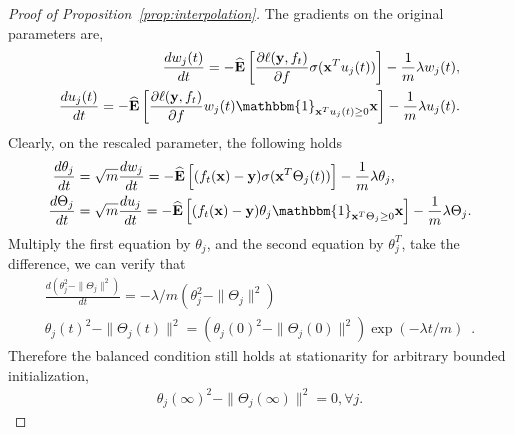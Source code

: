 \documentclass[11pt]{article}
\numberwithin{equation}{section}
\def\bd#1{\mathbf{#1}}
\def\bx{\bd{x}}
\def\by{\bd{y}}
\begin{document}
\begin{proof}[Proof of Proposition~\ref{prop:interpolation}]
    The gradients on the original parameters are,
    \begin{align*}
        \frac{dw_j(t)}{dt} = -\widehat{\mathbf{E}}\left[\frac{\partial \ell(\by,f_t)}{\partial f}\sigma(\bx^Tu_j(t))\right] - \frac{1}{m}\lambda w_j(t),\\
        \frac{du_j(t)}{dt} = -\widehat{\mathbf{E}}\left[\frac{\partial \ell(\by,f_t)}{\partial f}w_j(t)\mathbbm{1}_{\bx^Tu_j(t)\geq0}\bx\right] - \frac{1}{m}\lambda u_j(t).
    \end{align*}
    Clearly, on the rescaled parameter, the following holds
 \begin{align*}
    \frac{d\theta_{j}}{dt} &= \sqrt{m} \frac{d w_{j}}{dt}= -\widehat{\mathbf{E}}\left[(f_t(\bx) - \by) \sigma(\bx^T\Theta_j(t))\right] - \frac{1}{m} \lambda \theta_{j}, \\
    \frac{d\Theta_{j}}{dt} &= \sqrt{m} \frac{d u_{j}}{dt}= -\widehat{\mathbf{E}}\left[(f_t(\bx) - \by) \theta_{j}\mathbbm{1}_{\bx^T\Theta_{j}\geq0}\bx\right] - \frac{1}{m} \lambda \Theta_j.
\end{align*} 
Multiply the first equation by $\theta_j$, and the second equation by $\theta_j^T$, take the difference, we can verify that    
\begin{align}
    \frac{d ( \theta_j^2 - \| \Theta_j \|^2)}{dt}=  - \lambda/m ( \theta_j^2 - \| \Theta_j \|^2) \\
    \theta_j(t)^2 - \| \Theta_j(t) \|^2 = \left( \theta_j(0)^2 - \| \Theta_j(0) \|^2 \right) \exp(-\lambda t/m ) \enspace. \label{eq:balanced}
\end{align}
Therefore the balanced condition still holds at stationarity for arbitrary bounded initialization,
\begin{align*}
    \theta_j(\infty)^2 - \| \Theta_j(\infty) \|^2 = 0, \forall j.
\end{align*}



\end{proof}
\end{document}

